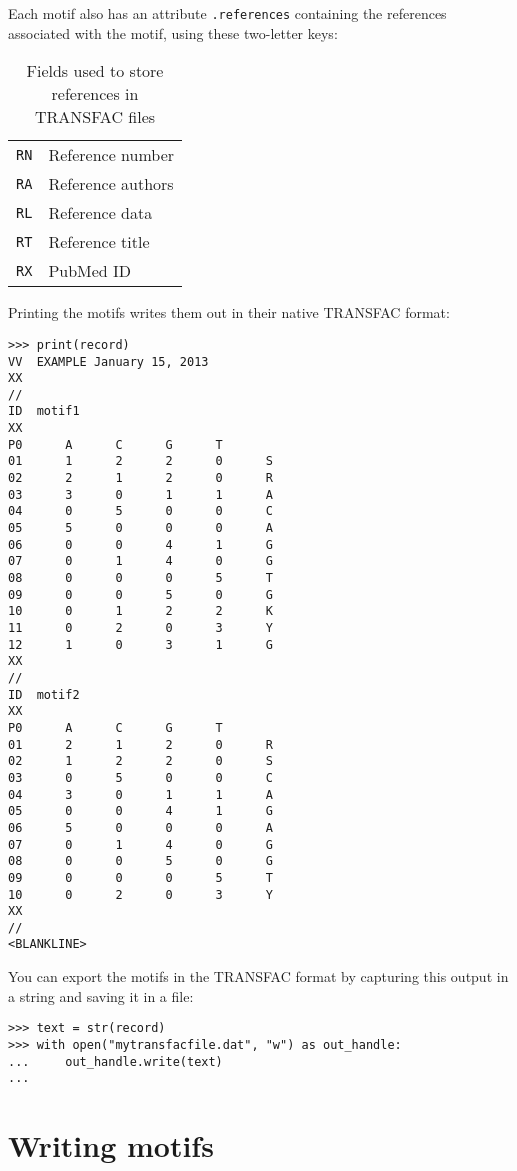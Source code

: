 Each motif also has an attribute \verb+.references+ containing the
references associated with the motif, using these two-letter keys:

\begin{table}[h]
\begin{center}
\caption{Fields used to store references in TRANSFAC files}
\begin{tabular}{|l|l||}
\verb+RN+ & Reference number \\
\verb+RA+ & Reference authors \\
\verb+RL+ & Reference data \\
\verb+RT+ & Reference title \\
\verb+RX+ & PubMed ID \\
\end{tabular}
\end{center}
\end{table}

Printing the motifs writes them out in their native TRANSFAC format:
\begin{verbatim}
>>> print(record)
VV  EXAMPLE January 15, 2013
XX
//
ID  motif1
XX
P0      A      C      G      T
01      1      2      2      0      S
02      2      1      2      0      R
03      3      0      1      1      A
04      0      5      0      0      C
05      5      0      0      0      A
06      0      0      4      1      G
07      0      1      4      0      G
08      0      0      0      5      T
09      0      0      5      0      G
10      0      1      2      2      K
11      0      2      0      3      Y
12      1      0      3      1      G
XX
//
ID  motif2
XX
P0      A      C      G      T
01      2      1      2      0      R
02      1      2      2      0      S
03      0      5      0      0      C
04      3      0      1      1      A
05      0      0      4      1      G
06      5      0      0      0      A
07      0      1      4      0      G
08      0      0      5      0      G
09      0      0      0      5      T
10      0      2      0      3      Y
XX
//
<BLANKLINE>
\end{verbatim}
You can export the motifs in the TRANSFAC format by capturing this output
in a string and saving it in a file:
\begin{verbatim}
>>> text = str(record)
>>> with open("mytransfacfile.dat", "w") as out_handle:
...     out_handle.write(text)
...
\end{verbatim}

\section{Writing motifs}

